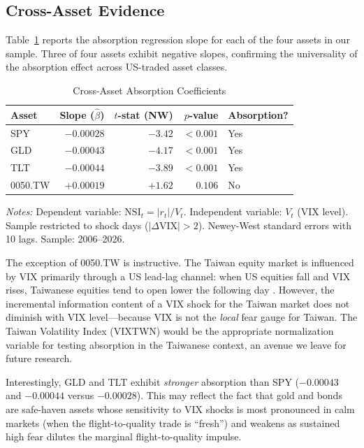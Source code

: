 \documentclass[12pt,a4paper]{article}
\begin{document}
\subsection{Cross-Asset Evidence}
\label{sec:cross_asset}

Table~\ref{tab:cross_asset} reports the absorption regression slope for each of the four assets in our sample. Three of four assets exhibit negative slopes, confirming the universality of the absorption effect across US-traded asset classes.

\begin{table}[H]
\centering
\caption{Cross-Asset Absorption Coefficients}
\label{tab:cross_asset}
\begin{threeparttable}
\begin{tabular}{lrrrl}
\toprule
Asset & Slope ($\hat{\beta}$) & $t$-stat (NW) & $p$-value & Absorption? \\
\midrule
SPY     & $-0.00028$ & $-3.42$ & $< 0.001$ & Yes \\
GLD     & $-0.00043$ & $-4.17$ & $< 0.001$ & Yes \\
TLT     & $-0.00044$ & $-3.89$ & $< 0.001$ & Yes \\
0050.TW & $+0.00019$ & $+1.62$ & $0.106$   & No  \\
\bottomrule
\end{tabular}
\begin{tablenotes}
\small
\item \textit{Notes:} Dependent variable: $\text{NSI}_t = |r_t| / V_t$. Independent variable: $V_t$ (VIX level). Sample restricted to shock days ($|\Delta\text{VIX}| > 2$). Newey-West standard errors with 10 lags. Sample: 2006--2026.
\end{tablenotes}
\end{threeparttable}
\end{table}

The exception of 0050.TW is instructive. The Taiwan equity market is influenced by VIX primarily through a US lead-lag channel: when US equities fall and VIX rises, Taiwanese equities tend to open lower the following day \citep{lin2020}. However, the incremental information content of a VIX shock for the Taiwan market does not diminish with VIX level---because VIX is not the \textit{local} fear gauge for Taiwan. The Taiwan Volatility Index (VIXTWN) would be the appropriate normalization variable for testing absorption in the Taiwanese context, an avenue we leave for future research.

Interestingly, GLD and TLT exhibit \textit{stronger} absorption than SPY ($-0.00043$ and $-0.00044$ versus $-0.00028$). This may reflect the fact that gold and bonds are safe-haven assets whose sensitivity to VIX shocks is most pronounced in calm markets (when the flight-to-quality trade is ``fresh'') and weakens as sustained high fear dilutes the marginal flight-to-quality impulse.
\end{document}
